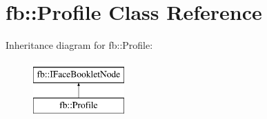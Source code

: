\hypertarget{classfb_1_1_profile}{\section{fb\+:\+:Profile Class Reference}
\label{classfb_1_1_profile}
}
Inheritance diagram for fb\+:\+:Profile\+:\begin{figure}[H]
\begin{center}
\leavevmode
\includegraphics[height=2.000000cm]{classfb_1_1_profile}
\end{center}
\end{figure}
